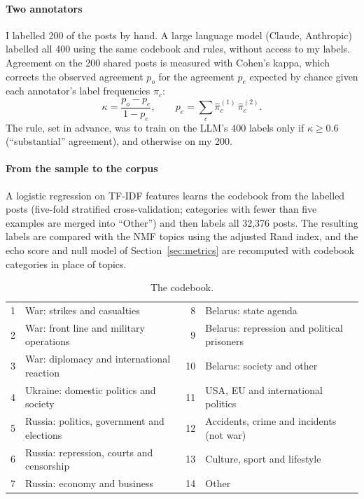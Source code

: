 \documentclass[11pt,a4paper]{article}
\begin{document}
\paragraph{Two annotators} I labelled 200 of the posts by hand. A large language model (Claude, Anthropic) labelled all 400 using the same codebook and rules, without access to my labels. Agreement on the 200 shared posts is measured with Cohen's kappa, which corrects the observed agreement $p_o$ for the agreement $p_e$ expected by chance given each annotator's label frequencies $\hat\pi_c$:
\begin{equation}
\kappa = \frac{p_o - p_e}{1 - p_e}, \qquad p_e = \sum_{c} \hat\pi^{(1)}_c\,\hat\pi^{(2)}_c .
\end{equation}
The rule, set in advance, was to train on the LLM's 400 labels only if $\kappa \geq 0.6$ (``substantial'' agreement), and otherwise on my 200.

\paragraph{From the sample to the corpus} A logistic regression on TF-IDF features learns the codebook from the labelled posts (five-fold stratified cross-validation; categories with fewer than five examples are merged into ``Other'') and then labels all 32,376 posts. The resulting labels are compared with the NMF topics using the adjusted Rand index, and the echo score and null model of Section~\ref{sec:metrics} are recomputed with codebook categories in place of topics.

\begin{table}[H]
\centering
\small
\caption{The codebook.}
\label{tab:codebook}
\begin{tabular}{rl@{\hspace{2em}}rl}
\toprule
1 & War: strikes and casualties & 8 & Belarus: state agenda \\
2 & War: front line and military operations & 9 & Belarus: repression and political prisoners \\
3 & War: diplomacy and international reaction & 10 & Belarus: society and other \\
4 & Ukraine: domestic politics and society & 11 & USA, EU and international politics \\
5 & Russia: politics, government and elections & 12 & Accidents, crime and incidents (not war) \\
6 & Russia: repression, courts and censorship & 13 & Culture, sport and lifestyle \\
7 & Russia: economy and business & 14 & Other \\
\bottomrule
\end{tabular}
\end{table}
\end{document}
